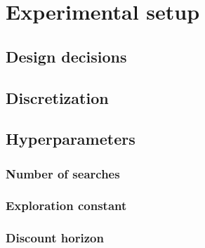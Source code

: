 \chapter{Experimental setup}
\label{sec:methodology}

\section{Design decisions}
\section{Discretization}
\section{Hyperparameters}
\subsection{Number of searches}
\subsection{Exploration constant}
\subsection{Discount horizon}

